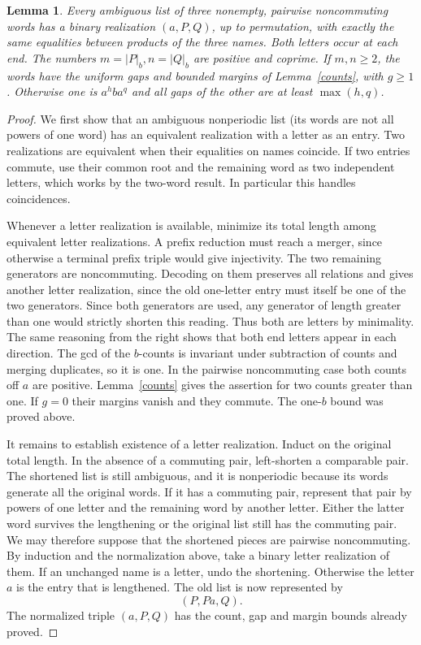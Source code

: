 \documentclass[11pt,a4paper]{article}
\newtheorem{lemma}{Lemma}
\newcommand{\bct}[1]{\lvert #1\rvert_b}
\begin{document}
\begin{lemma}\label{model}
Every ambiguous list of three nonempty, pairwise noncommuting words has a binary realization $(a,P,Q)$, up to permutation, with exactly the same equalities between products of the three names. Both letters occur at each end. The numbers $m=\bct P,n=\bct Q$ are positive and coprime. If $m,n\ge2$, the words have the uniform gaps and bounded margins of Lemma~\ref{counts}, with $g\ge1$. Otherwise one is $a^h b a^q$ and all gaps of the other are at least $\max(h,q)$.
\end{lemma}
\begin{proof}
We first show that an ambiguous nonperiodic list (its words are not all powers of one word) has an equivalent realization with a letter as an entry. Two realizations are equivalent when their equalities on names coincide. If two entries commute, use their common root and the remaining word as two independent letters, which works by the two-word result. In particular this handles coincidences.

Whenever a letter realization is available, minimize its total length among equivalent letter realizations. A prefix reduction must reach a merger, since otherwise a terminal prefix triple would give injectivity. The two remaining generators are noncommuting. Decoding on them preserves all relations and gives another letter realization, since the old one-letter entry must itself be one of the two generators. Since both generators are used, any generator of length greater than one would strictly shorten this reading. Thus both are letters by minimality. The same reasoning from the right shows that both end letters appear in each direction. The gcd of the $b$-counts is invariant under subtraction of counts and merging duplicates, so it is one. In the pairwise noncommuting case both counts off $a$ are positive. Lemma~\ref{counts} gives the assertion for two counts greater than one. If $g=0$ their margins vanish and they commute. The one-$b$ bound was proved above.

It remains to establish existence of a letter realization. Induct on the original total length. In the absence of a commuting pair, left-shorten a comparable pair. The shortened list is still ambiguous, and it is nonperiodic because its words generate all the original words. If it has a commuting pair, represent that pair by powers of one letter and the remaining word by another letter. Either the latter word survives the lengthening or the original list still has the commuting pair. We may therefore suppose that the shortened pieces are pairwise noncommuting. By induction and the normalization above, take a binary letter realization of them. If an unchanged name is a letter, undo the shortening. Otherwise the letter $a$ is the entry that is lengthened. The old list is now represented by
\[
                         (P,Pa,Q).
\]
The normalized triple $(a,P,Q)$ has the count, gap and margin bounds already proved.


\end{proof}
\end{document}
